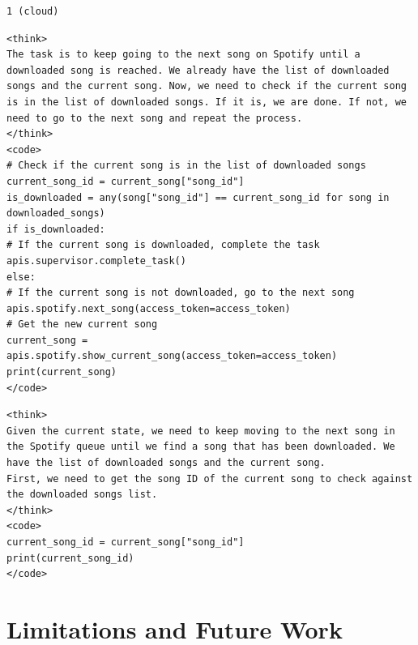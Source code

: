 \documentclass{article}
\begin{document}
\begin{herabox}[title=Step 8: Hera decision]
\begin{lstlisting}[style=mytt]
1 (cloud)
\end{lstlisting}
\end{herabox}

\begin{cloudbox}[title=Step 8: cloud agent output]
\begin{lstlisting}[style=mytt]
<think>
The task is to keep going to the next song on Spotify until a downloaded song is reached. We already have the list of downloaded songs and the current song. Now, we need to check if the current song is in the list of downloaded songs. If it is, we are done. If not, we need to go to the next song and repeat the process.
</think>
<code>
# Check if the current song is in the list of downloaded songs
current_song_id = current_song["song_id"]
is_downloaded = any(song["song_id"] == current_song_id for song in downloaded_songs)
if is_downloaded:
# If the current song is downloaded, complete the task
apis.supervisor.complete_task()
else:
# If the current song is not downloaded, go to the next song
apis.spotify.next_song(access_token=access_token)
# Get the new current song
current_song = apis.spotify.show_current_song(access_token=access_token)
print(current_song)
</code>
\end{lstlisting}
\end{cloudbox}

\begin{devicebox}[title=Step 8: device agent output (if routed)]
\begin{lstlisting}[style=mytt]
<think>
Given the current state, we need to keep moving to the next song in the Spotify queue until we find a song that has been downloaded. We have the list of downloaded songs and the current song.
First, we need to get the song ID of the current song to check against the downloaded songs list.
</think>
<code>
current_song_id = current_song["song_id"]
print(current_song_id)
</code>
\end{lstlisting}
\end{devicebox}

\section{Limitations and Future Work}
\label{appdendix:limit_future}
\end{document}
